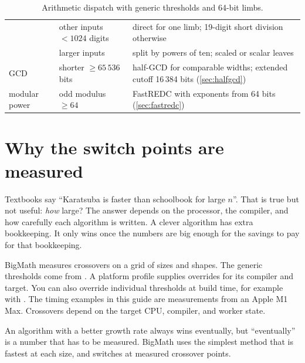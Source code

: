\begin{table}[!t]
\begin{tabularx}{\textwidth}{@{}l l >{\raggedright\arraybackslash}X@{}}
       & other inputs $<1024$ digits & direct for one limb; 19-digit short division otherwise \\
       & larger inputs & split by powers of ten; scaled or scalar leaves \\
\midrule
GCD & shorter $\ge 65\,536$ bits & half-GCD for comparable widths; extended cutoff 16\,384 bits (\cref{sec:halfgcd}) \\
modular power & odd modulus $\ge 64$ & FastREDC with exponents from 64 bits (\cref{sec:fastredc}) \\
\bottomrule
\end{tabularx}
\caption{Arithmetic dispatch with generic thresholds and 64-bit limbs.}
\label{tab:onepage}
\end{table}

\section{Why the switch points are measured}
\label{sec:measured}

Textbooks say ``Karatsuba is faster than schoolbook for large $n$''. That is true but
not useful: \emph{how} large? The answer depends on the processor, the compiler, and
how carefully each algorithm is written. A clever algorithm has extra bookkeeping. It
only wins once the numbers are big enough for the savings to pay for that bookkeeping.

BigMath measures crossovers on a grid of sizes and shapes. The generic
thresholds come from .
A platform profile supplies overrides for its compiler and target. You
can also override individual thresholds at build time, for example with
. The timing examples in this
guide are measurements from an Apple M1 Max. Crossovers depend on the
target CPU, compiler, and worker state.

\begin{keyidea}
An algorithm with a better growth rate always wins eventually, but ``eventually'' is
a number that has to be measured. BigMath uses the simplest method that is fastest at
each size, and switches at measured crossover points.
\end{keyidea}

